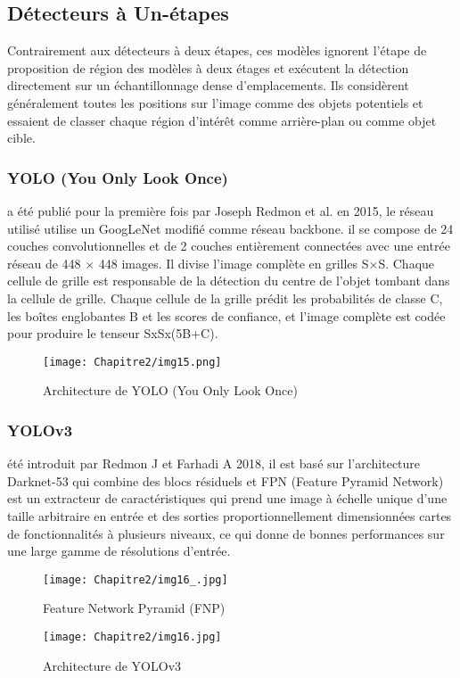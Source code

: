      \subsection{Détecteurs à Un-étapes}
     Contrairement aux détecteurs à deux étapes, ces modèles ignorent l'étape de proposition de région des modèles à deux étages et exécutent la détection directement sur un échantillonnage dense d'emplacements. Ils considèrent généralement toutes les positions sur l'image comme des objets potentiels et essaient de classer chaque région d'intérêt comme arrière-plan ou comme objet cible.

     \subsubsection{YOLO (You Only Look Once)} \cite{yolo_paper}
     a été publié pour la première fois par Joseph Redmon et al. en 2015, le réseau utilisé utilise un GoogLeNet modifié comme réseau backbone. il se compose de 24 couches convolutionnelles et de 2 couches entièrement connectées avec une entrée réseau de 448 × 448 images. Il divise l'image complète en grilles S×S. Chaque cellule de grille est responsable de la détection du centre de l'objet tombant dans la cellule de grille. Chaque cellule de la grille prédit les probabilités de classe C, les boîtes englobantes B et les scores de confiance, et l'image complète est codée pour produire le tenseur SxSx(5B+C).
     \begin{figure}[H]
          \centering
          \texttt{[image: Chapitre2/img15.png]}
          \caption{Architecture de YOLO (You Only Look Once)}
          \label{img15}
          \end{figure}

     \subsubsection{YOLOv3} \cite{yolov3_paper}
     été introduit par Redmon J et Farhadi A 2018, il est basé sur l'architecture Darknet-53 qui combine des blocs résiduels et FPN (Feature Pyramid Network) est un extracteur de caractéristiques qui prend une image à échelle unique d'une taille arbitraire en entrée et des sorties proportionnellement dimensionnées cartes de fonctionnalités à plusieurs niveaux, ce qui donne de bonnes performances sur une large gamme de résolutions d'entrée.
     \begin{figure}[H]
          \centering
          \texttt{[image: Chapitre2/img16\_.jpg]}
          \caption{Feature Network Pyramid (FNP)}
          \label{img16_}
          \end{figure}
     \begin{figure}[H]
          \centering
          \texttt{[image: Chapitre2/img16.jpg]}
          \caption{Architecture de YOLOv3}
          \label{img16}
          \end{figure}
     
